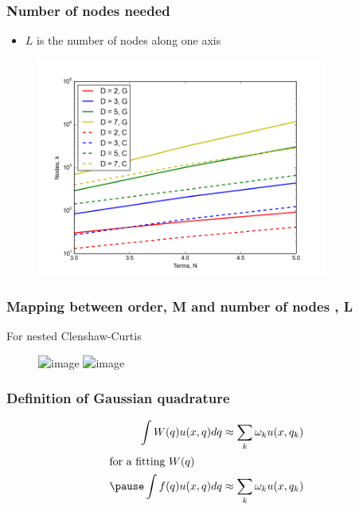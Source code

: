 \documentclass{beamer}
\begin{document}
 
 \begin{frame}
  \frametitle{Number of nodes needed}
  \begin{itemize}
   \item $L$ is the number of nodes along one axis
  \end{itemize}

 \begin{figure}
  \includegraphics[width=0.85\textwidth]{dimensionality_nodes_sparse.png}
 \end{figure}
 \end{frame}

  
  \begin{frame}
   \frametitle{Mapping between order, M and number of nodes , L}
   For nested Clenshaw-Curtis
   \begin{figure}
    \includegraphics<1>[width=0.85\textwidth]{LvsM1.png}
    \includegraphics<2>[width=0.85\textwidth]{LvsM.png}
   \end{figure}

   

  \end{frame}

  
  
 \begin{frame}
  \frametitle{Definition of Gaussian quadrature}
  \begin{align*}
   \int W(q)u(x,q)dq &\approx \sum_k \omega_k u(x,q_k)\\
   \intertext{for a fitting $W(q)$}
   \pause
   \int f(q)u(x,q)dq &\approx \sum_k \omega_k u(x,q_k)\\
     \end{align*}
 \end{frame}
\end{document}
